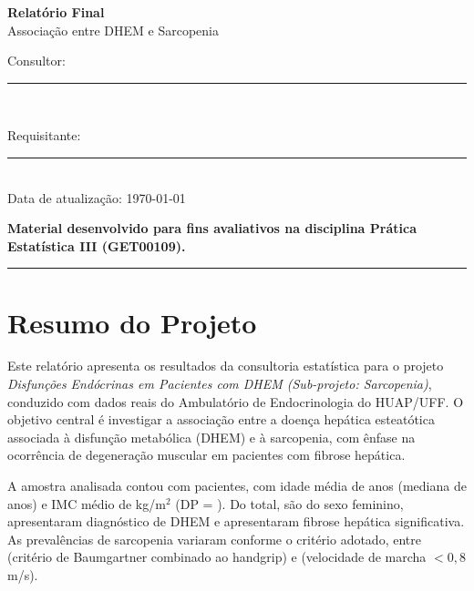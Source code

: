\documentclass[11pt,a4paper]{article}
\begin{document}

\begin{flushright}
  {\LARGE\bfseries Relatório Final}\\[0.4em]
  {\large Associação entre DHEM e Sarcopenia}\\[0.8em]
  {\normalsize Consultor: \rule[-0.05cm]{3.2cm}{0.4pt}}\\
  {\normalsize Requisitante: \rule[-0.05cm]{3.2cm}{0.4pt}}\\
  {\normalsize Data de atualização: \today}
\end{flushright}

\vspace{0.6cm}
\begin{center}
  \textbf{Material desenvolvido para fins avaliativos na disciplina Prática
  Estatística III (GET00109).}
\end{center}

\vspace{0.6cm}
\tableofcontents
\vspace{0.6cm}
\hrule
\vspace{0.8cm}

\section{Resumo do Projeto}

Este relatório apresenta os resultados da consultoria estatística para o
projeto \textit{Disfunções Endócrinas em Pacientes com DHEM (Sub-projeto:
Sarcopenia)}, conduzido com dados reais do Ambulatório de Endocrinologia do
HUAP/UFF. O objetivo central é investigar a associação entre a doença hepática
esteatótica associada à disfunção metabólica (DHEM) e à sarcopenia, com ênfase
na ocorrência de degeneração muscular em pacientes com fibrose hepática.

A amostra analisada contou com \NTotal{} pacientes, com idade média de
\MediaIdade{} anos (mediana de \MedianaIdade{} anos) e IMC médio de \MediaIMC{}
kg/m$^2$ (DP = \DPIMC{}). Do total, \PercMulheres{} são do sexo feminino,
\PercDHEM{} apresentaram diagnóstico de DHEM e \PercFibrose{} apresentaram
fibrose hepática significativa. As prevalências de sarcopenia variaram conforme
o critério adotado, entre \PercSarcBaumgartner{} (critério de Baumgartner
combinado ao handgrip) e \PercSarcVel{} (velocidade de marcha $< 0{,}8$ m/s).
\end{document}
